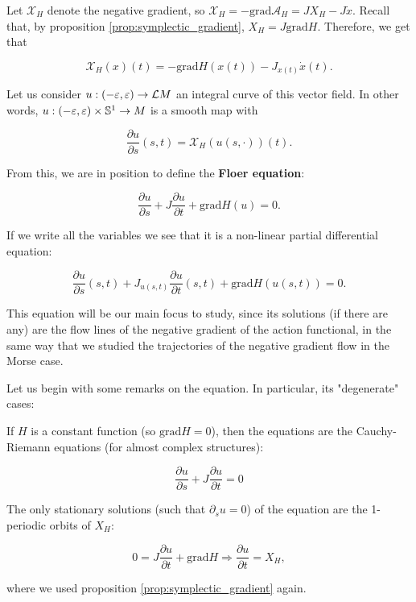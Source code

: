 Let $\mathcal{X}_H$ denote the negative gradient, so $\mathcal{X}_H = - \text{grad}\mathcal{A}_H = J X_H - J \dot{x}$. Recall that, by proposition \ref{prop:symplectic_gradient}, $X_H = J \text{grad} H$. Therefore, we get that

$$\mathcal{X}_H(x)(t) = - \text{grad}H(x(t)) - J_{x(t)} \dot{x}(t) .$$

Let us consider $u : (-\varepsilon,\varepsilon) \rightarrow \mathcal{L}M$ an integral curve of this vector field. In other words, $u : (-\varepsilon,\varepsilon) \times \mathbb{S}^1 \rightarrow M$ is a smooth map with

$$\frac{\partial u}{\partial s} (s,t) = \mathcal{X}_H(u(s,\cdot)) (t) .$$

From this, we are in position to define the {\bf Floer equation}:

\begin{equation} \label{equation:floer_equation}
\frac{\partial u}{\partial s} + J \frac{\partial u}{\partial t} + \text{grad}H(u) = 0 .
\end{equation}

If we write all the variables we see that it is a non-linear partial differential equation:

$$\frac{\partial u}{\partial s}(s,t) + J_{u(s,t)} \frac{\partial u}{\partial t}(s,t) + \text{grad}H(u(s,t)) = 0 .$$

This equation will be our main focus to study, since its solutions (if there are any) are the flow lines of the negative gradient of the action functional, in the same way that we studied the trajectories of the negative gradient flow in the Morse case.

Let us begin with some remarks on the equation. In particular, its "degenerate" cases:

\begin{rmrk}
If $H$ is a constant function (so $\text{grad}H = 0$), then the equations are the Cauchy-Riemann equations (for almost complex structures):

$$\frac{\partial u}{\partial s} + J \frac{\partial u}{\partial t} = 0$$
\end{rmrk}

\begin{rmrk}
The only stationary solutions (such that $\partial_s u = 0$) of the equation are the 1-periodic orbits of $X_H$:

$$0 = J \frac{\partial u}{\partial t} + \text{grad}H \Rightarrow \frac{\partial u}{\partial t} = X_H ,$$

where we used proposition \ref{prop:symplectic_gradient} again.
\end{rmrk}

